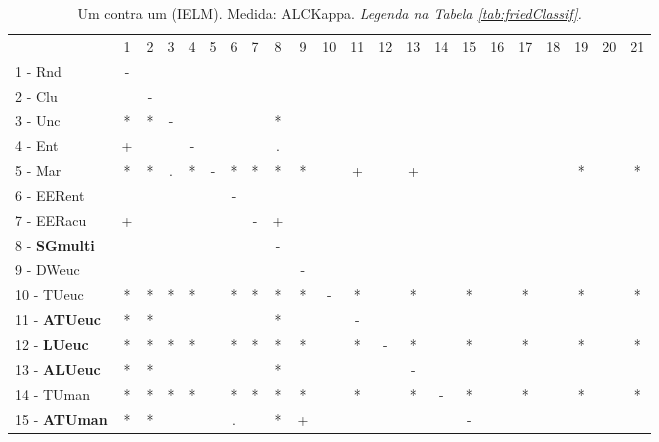 \begin{table}[h]
\caption{Um contra um (IELM). Medida: ALCKappa. \textit{Legenda na Tabela \ref{tab:friedClassif}.}}
\begin{center}\begin{tabular}{lcc|cc|cc|cc|cc|cc|cc|cc|cc|cc|c}
 			& 1 & 2 & 3 & 4 & 5 & 6 & 7 & 8 & 9 & 10 & 11 & 12 & 13 & 14 & 15 & 16 & 17 & 18 & 19 & 20 & 21\\
1 - Rnd  	& - &   &   &   &   &   &   &   &   &   &   &   &   &   &   &   &   &   &   &   &   \\
2 - Clu  	&   & - &   &   &   &   &   &   &   &   &   &   &   &   &   &   &   &   &   &   &   \\ \hline
3 - Unc  	& * & * & - &   &   &   &   & * &   &   &   &   &   &   &   &   &   &   &   &   &   \\
4 - Ent  	& + &   &   & - &   &   &   & . &   &   &   &   &   &   &   &   &   &   &   &   &   \\ \hline
5 - Mar  	& * & * & . & * & - & * & * & * & * &   & + &   & + &   &   &   &   &   & * &   & * \\
6 - EERent	&   &   &   &   &   & - &   &   &   &   &   &   &   &   &   &   &   &   &   &   &   \\ \hline
7 - EERacu	& + &   &   &   &   &   & - & + &   &   &   &   &   &   &   &   &   &   &   &   &   \\
8 - \textbf{SGmulti}	&   &   &   &   &   &   &   & - &   &   &   &   &   &   &   &   &   &   &   &   &   \\ \hline
9 - DWeuc	&   &   &   &   &   &   &   &   & - &   &   &   &   &   &   &   &   &   &   &   &   \\
10 - TUeuc	& * & * & * & * &   & * & * & * & * & - & * &   & * &   & * &   & * &   & * &   & * \\ \hline
11 - \textbf{ATUeuc}	& * & * &   &   &   &   &   & * &   &   & - &   &   &   &   &   &   &   &   &   &   \\
12 - \textbf{LUeuc}	& * & * & * & * &   & * & * & * & * &   & * & - & * &   & * &   & * &   & * &   & * \\ \hline
13 - \textbf{ALUeuc}	& * & * &   &   &   &   &   & * &   &   &   &   & - &   &   &   &   &   &   &   &   \\
14 - TUman	& * & * & * & * &   & * & * & * & * &   & * &   & * & - & * &   & * &   & * &   & * \\ \hline
15 - \textbf{ATUman}	& * & * &   &   &   & . &   & * & + &   &   &   &   &   & - &   &   &   &   &   &   \\

\end{tabular}
\end{center}
\end{table}
